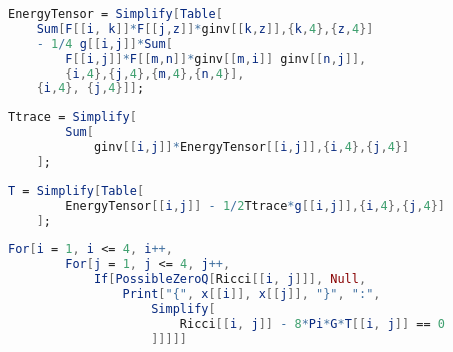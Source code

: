 \begin{mathematica}\label{mathematica energy momentum tensor}
\begin{lstlisting}[language=mathematica]
    EnergyTensor = Simplify[Table[
    Sum[F[[i, k]]*F[[j,z]]*ginv[[k,z]],{k,4},{z,4}] 
    - 1/4 g[[i,j]]*Sum[
        F[[i,j]]*F[[m,n]]*ginv[[m,i]] ginv[[n,j]], 
        {i,4},{j,4},{m,4},{n,4}], 
    {i,4}, {j,4}]];
\end{lstlisting}
\end{mathematica}

\begin{mathematica}\label{mathematica trace of ene mom ten}
\begin{lstlisting}[language=mathematica]
    Ttrace = Simplify[
        Sum[
            ginv[[i,j]]*EnergyTensor[[i,j]],{i,4},{j,4}]
    ];
\end{lstlisting}
\end{mathematica}

\begin{mathematica}\label{mathematica rs of einstein eq}
\begin{lstlisting}[language=mathematica]
    T = Simplify[Table[
        EnergyTensor[[i,j]] - 1/2Ttrace*g[[i,j]],{i,4},{j,4}]
    ];
\end{lstlisting}
\end{mathematica}

\begin{mathematica}\label{mathematica system of einstein equations}
\begin{lstlisting}[language=mathematica]
    For[i = 1, i <= 4, i++, 
        For[j = 1, j <= 4, j++, 
            If[PossibleZeroQ[Ricci[[i, j]]], Null, 
                Print["{", x[[i]], x[[j]], "}", ":", 
                    Simplify[
                        Ricci[[i, j]] - 8*Pi*G*T[[i, j]] == 0
                    ]]]]]
\end{lstlisting}
\end{mathematica}
